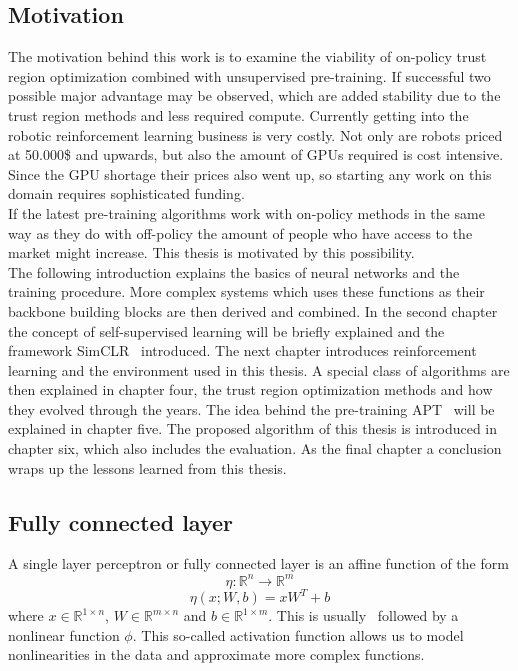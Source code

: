 \documentclass{article}
\begin{document}
\subsection{Motivation}
The motivation behind this work is to examine the viability of on-policy trust region optimization combined with unsupervised pre-training.
If successful two possible major advantage may be observed, which are added stability due to the trust region methods and less
required compute. Currently getting into the robotic reinforcement learning business is very costly. Not only
are robots priced at 50.000\$ and upwards, but also the amount of GPUs required is cost intensive. Since the GPU shortage
their prices also went up, so starting any work on this domain requires sophisticated funding.\\
If the latest pre-training algorithms work with on-policy methods in the same way as they do with off-policy the amount of
people who have access to the market might increase.
This thesis is motivated by this possibility.\\
The following introduction explains the basics of neural networks and the training
procedure. More complex systems which uses these functions as their backbone building blocks are then
derived and combined. In the second chapter the concept of self-supervised learning will be briefly
explained and the framework SimCLR~\cite{DBLP:journals/corr/abs-2002-05709} introduced. 
The next chapter introduces reinforcement
learning and the environment used in this thesis. A special class of algorithms are then explained in chapter four,
the trust region optimization methods and how they evolved through the years.
The idea behind the pre-training APT~\cite{DBLP:journals/corr/abs-2103-04551}
will be explained in chapter five. The proposed algorithm of this thesis is introduced in chapter six,
which also includes the evaluation. As the final chapter a conclusion wraps up the lessons learned
from this thesis.

\subsection{Fully connected layer}
A single layer perceptron or fully connected layer is an affine function of the form 
\begin{equation}
    \eta: 	\mathbb{R}^n \xrightarrow{} \mathbb{R}^m
\end{equation}
\begin{equation*}
    \eta(x; W, b) = x W^T + b
\end{equation*}
where $x\in \mathbb{R}^{1 \times n} $, $W\in \mathbb{R}^{m \times n}$ and $ b \in \mathbb{R}^{1 \times m}$.
This is usually~\cite{kulathunga2020effects} followed by a nonlinear function $\phi$. This so-called activation function allows us
to model nonlinearities in the data and approximate more complex functions.\\
\end{document}
